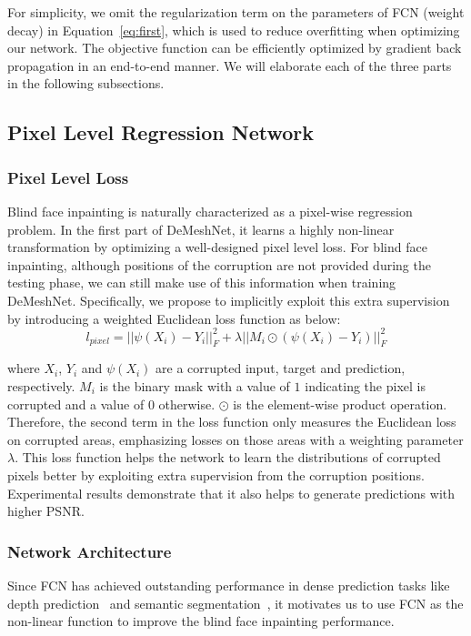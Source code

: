 \documentclass[10pt,twocolumn,letterpaper]{article}
\begin{document}
For simplicity, we omit the regularization term on the parameters of FCN (weight decay) in Equation~\ref{eq:first}, which is used to reduce overfitting when optimizing our network. The objective function can be efficiently optimized by gradient back propagation in an end-to-end manner. We will elaborate each of the three parts in the following subsections.












\subsection{Pixel Level Regression Network}

\subsubsection{Pixel Level Loss}Blind face inpainting is naturally characterized as a pixel-wise regression problem. In the first part of DeMeshNet, it learns a highly non-linear transformation by optimizing a well-designed pixel level loss. For blind face inpainting, although positions of the corruption are not provided during the testing phase, we can still make use of this information when training DeMeshNet. Specifically, we propose to implicitly exploit this extra supervision by introducing a weighted Euclidean loss function as below:
\begin{equation}{l_{pixel}} =||\psi ({X_i} ) - {Y_i}||_F^2 + \lambda ||{M_i} \odot (\psi ({X_i} ) - {Y_i})||_F^2
\end{equation}

where $X_i$, $Y_i$ and $\psi ({X_i})$ are a corrupted input, target and prediction, respectively. $M_i$ is the binary mask with a value of $1$ indicating the pixel is corrupted and a value of $0$ otherwise. $\odot$ is the element-wise product operation. Therefore, the second term in the loss function only measures the Euclidean loss on corrupted areas, emphasizing losses on those areas with a weighting parameter $\lambda$. This loss function helps the network to learn the distributions of corrupted pixels better by exploiting extra supervision from the corruption positions. Experimental results demonstrate that it also helps to generate predictions with higher PSNR.


\subsubsection{Network Architecture} Since FCN has achieved outstanding performance in dense prediction tasks like depth prediction~\cite{eigen2014depth} and semantic segmentation~\cite{long2015fully}, it motivates us to use FCN as the non-linear function to improve the blind face inpainting performance.
\end{document}
